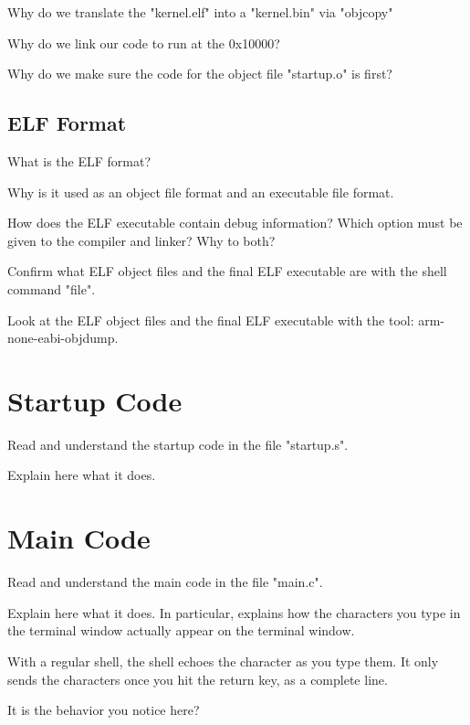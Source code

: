 \documentclass[10]{article}
\begin{document}
Why do we translate the "kernel.elf" into a "kernel.bin" via "objcopy"

Why do we link our code to run at the 0x10000? 

Why do we make sure the code for the object file "startup.o" is first?

\subsection{ELF Format}

What is the ELF format?

Why is it used as an object file format and an executable file format.

How does the ELF executable contain debug information? Which option must
be given to the compiler and linker? Why to both?

Confirm what ELF object files and the final ELF executable are with the shell command "file".

Look at the ELF object files and the final ELF executable with the tool: arm-none-eabi-objdump.

\section{Startup Code}

Read and understand the startup code in the file "startup.s".

Explain here what it does.

\section{Main Code}

Read and understand the main code in the file "main.c".

Explain here what it does. In particular, explains how the characters
you type in the terminal window actually appear on the terminal window.

With a regular shell, the shell echoes the character as you type them.
It only sends the characters once you hit the return key, as a complete line.

It is the behavior you notice here? 
\end{document}
